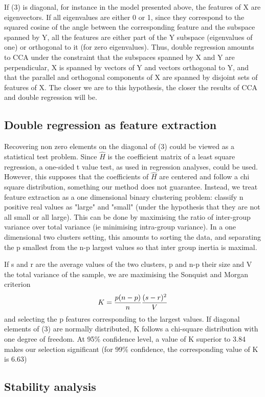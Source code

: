 \documentclass{article}
\begin{document}
If (3) is diagonal, for instance in the model presented above, the features of X are eigenvectors. If all eigenvalues are either 0 or 1, since they correspond to the squared cosine of the angle between the corresponding feature and the subspace spanned by Y, all the features are either part of the Y subspace (eigenvalues of one) or orthogonal to it (for zero eigenvalues). Thus, double regression amounts to CCA under the constraint that the subspaces spanned by X and Y are perpendicular, X is spanned by vectors of Y and vectors orthogonal to Y, and that the parallel and orthogonal components of X are spanned by disjoint sets of features of X. The closer we are to this hypothesis, the closer the results of CCA and double regression will be.

\subsection{Double regression as feature extraction}

Recovering non zero elements on the diagonal of (3) could be viewed as a statistical test problem. Since $\hat H$ is the coefficient matrix of a least square regression, a one-sided t value test, as used in regression analyses, could be used. However, this supposes that the coefficients of $\hat H$ are centered and follow a chi square distribution, something our method does not guarantee. Instead, we treat feature extraction as a one dimensional binary clustering problem: classify n positive real values as "large" and "small" (under the hypothesis that they are not all small or all large). This can be done by maximising the ratio of inter-group variance over total variance (ie minimising intra-group variance). In a one dimensional two clusters setting, this amounts to sorting the data, and separating the p smallest from the n-p largest values so that inter group inertia is maximal. 

If s and r are the average values of the two clusters, p and n-p their size and V the total variance of the sample, we are maximising the Sonquist and Morgan criterion $$K = {p (n-p) \over n} {(s-r)^2 \over V}$$ and selecting the p features corresponding to the largest values. If diagonal elements of (3) are normally distributed, K follows a chi-square distribution with one degree of freedom. At 95\% confidence level, a value of K superior to 3.84 makes our selection significant (for 99\% confidence, the corresponding value of K is 6.63) \citep{Kass_75}

\subsection{Stability analysis}
\end{document}
